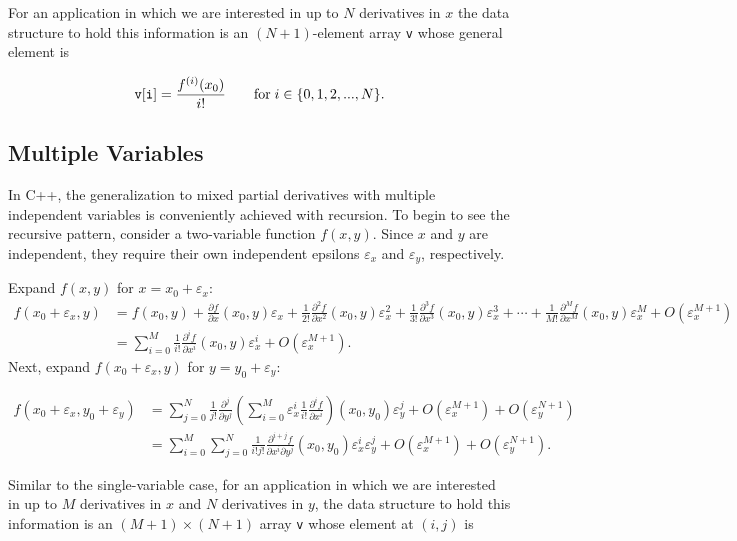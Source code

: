 \documentclass{article}
\begin{document}
For an application in which we are interested in up to $N$ derivatives in $x$ the data structure to hold
this information is an $(N+1)$-element array {\tt v} whose general element is

\[ {\tt v[i]} = \frac{f^{(i)}(x_0)}{i!} \qquad \text{for}\; i\in\{0,1,2,...,N\}. \]

\subsection{Multiple Variables}

In C++, the generalization to mixed partial derivatives with multiple independent variables is conveniently achieved
with recursion. To begin to see the recursive pattern, consider a two-variable function $f(x,y)$. Since $x$
and $y$ are independent, they require their own independent epsilons $\varepsilon_x$ and $\varepsilon_y$,
respectively.

Expand $f(x,y)$ for $x=x_0+\varepsilon_x$:
\begin{align*}
f(x_0+\varepsilon_x,y) &= f(x_0,y)
+ \frac{\partial f}{\partial x}(x_0,y)\varepsilon_x
+ \frac{1}{2!}\frac{\partial^2 f}{\partial x^2}(x_0,y)\varepsilon_x^2
+ \frac{1}{3!}\frac{\partial^3 f}{\partial x^3}(x_0,y)\varepsilon_x^3
+ \cdots
+ \frac{1}{M!}\frac{\partial^M f}{\partial x^M}(x_0,y)\varepsilon_x^M
+ O\left(\varepsilon_x^{M+1}\right) \\
&= \sum_{i=0}^M\frac{1}{i!}\frac{\partial^i f}{\partial x^i}(x_0,y)\varepsilon_x^i + O\left(\varepsilon_x^{M+1}\right).
\end{align*}
Next, expand $f(x_0+\varepsilon_x,y)$ for $y=y_0+\varepsilon_y$:

\begin{align*}
f(x_0+\varepsilon_x,y_0+\varepsilon_y) &= \sum_{j=0}^N\frac{1}{j!}\frac{\partial^j}{\partial y^j}
    \left(\sum_{i=0}^M\varepsilon_x^i\frac{1}{i!}\frac{\partial^if}{\partial x^i}\right)(x_0,y_0)\varepsilon_y^j
    + O\left(\varepsilon_x^{M+1}\right) + O\left(\varepsilon_y^{N+1}\right) \\
&= \sum_{i=0}^M\sum_{j=0}^N\frac{1}{i!j!}\frac{\partial^{i+j}f}{\partial x^i\partial y^j}(x_0,y_0)
   \varepsilon_x^i\varepsilon_y^j + O\left(\varepsilon_x^{M+1}\right) + O\left(\varepsilon_y^{N+1}\right).
\end{align*}

Similar to the single-variable case, for an application in which we are interested in up to $M$ derivatives in
$x$ and $N$ derivatives in $y$, the data structure to hold this information is an $(M+1)\times(N+1)$
array {\tt v} whose element at $(i,j)$ is
\end{document}

